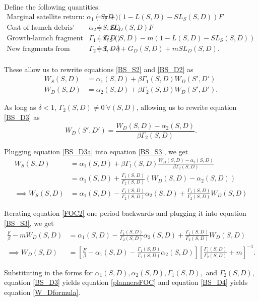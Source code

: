 \documentclass[12pt]{article}
\begin{document}
Define the following quantities:
\begin{align*}
\text{Marginal satellite return: } \alpha_1(S,D) &= \pi + ( 1 - L(S,D) - SL_S(S,D)) F \\
\text{Cost of launch debris' collisions: } \alpha_2(S,D) &= -SL_D(S,D)F \\
\text{Growth-launch fragment balance: } \Gamma_1(S,D) &= G_S(S,D) -  m ( 1 - L(S,D) - SL_S(S,D))  \\
\text{New fragments from current stock: } \Gamma_2(S,D) &= 1 - \delta + G_D(S,D) + mSL_D(S,D). \\
\end{align*}

These allow us to rewrite equations \ref{BS_S2} and \ref{BS_D2} as
\begin{align}
\label{BS_S3}
W_S(S,D) &= \alpha_1(S,D) + \beta \Gamma_1(S,D)W_D(S',D') \\
\label{BS_D3}
W_D(S,D) &= \alpha_2(S,D) + \beta \Gamma_2(S,D) W_D(S',D').
\end{align}

As long as $\delta < 1$, $\Gamma_2(S,D) \neq 0 ~\forall (S,D)$, allowing us to rewrite equation \ref{BS_D3} as
\begin{equation}
\label{BS_D3a}
W_D(S',D') = \frac{W_D(S,D) - \alpha_2(S,D)}{\beta \Gamma_2(S,D)}.
\end{equation}

Plugging equation \ref{BS_D3a} into equation \ref{BS_S3}, we get
\begin{align}
W_S(S,D) &= \alpha_1(S,D) + \beta \Gamma_1(S,D) \frac{W_D(S,D) - \alpha_2(S,D)}{\beta \Gamma_2(S,D)} \nonumber \\
&= \alpha_1(S,D) + \frac{\Gamma_1(S,D)}{\Gamma_2(S,D)} (W_D(S,D) - \alpha_2(S,D)) \nonumber \\
\label{BS_S3a}
\implies W_S(S,D) &= \alpha_1(S,D) - \frac{\Gamma_1(S,D)}{\Gamma_2(S,D)}\alpha_2(S,D) + \frac{\Gamma_1(S,D)}{\Gamma_2(S,D)} W_D(S,D) 
\end{align}

Iterating equation \ref{FOC2} one period backwards and plugging it into equation \ref{BS_S3}, we get
\begin{align}
\frac{F}{\beta} - m W_D(S,D) &= \alpha_1(S,D) - \frac{\Gamma_1(S,D)}{\Gamma_2(S,D)}\alpha_2(S,D) + \frac{\Gamma_1(S,D)}{\Gamma_2(S,D)} W_D(S,D) \nonumber \\
\label{BS_D4}
\implies W_D(S,D) &= \left[ \frac{F}{\beta} -  \alpha_1(S,D) - \frac{\Gamma_1(S,D)}{\Gamma_2(S,D)}\alpha_2(S,D) \right] \left[ \frac{\Gamma_1(S,D)}{\Gamma_2(S,D)} + m \right]^{-1}.
\end{align}

Substituting in the forms for $\alpha_1(S,D), \alpha_2(S,D), \Gamma_1(S,D),$ and $\Gamma_2(S,D)$, equation \ref{BS_D3} yields equation \ref{plannersFOC} and equation \ref{BS_D4} yields equation \ref{W_Dformula}.
\end{document}
